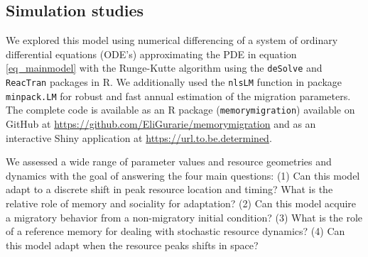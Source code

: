 \documentclass[12pt]{article}
\begin{document}
\subsection{Simulation studies}

We explored this model using numerical differencing of a system of ordinary differential equations (ODE's) approximating the PDE in equation \ref{eq_mainmodel} with the Runge-Kutte algorithm using the \texttt{deSolve} \citep{Soetaert2010} and \texttt{ReacTran} \citep{Soetaert2012} packages in R. We additionally used the \texttt{nlsLM} function in package \texttt{minpack.LM} \citep{minpack.lm} for robust and fast annual estimation of the migration parameters. The complete code is available as an R package (\texttt{memorymigration}) available on GitHub at \url{https://github.com/EliGurarie/memorymigration} and as an interactive Shiny application at \url{https://url.to.be.determined}.

We assessed a wide range of parameter values and resource geometries and dynamics with the goal of answering the four main questions: (1) Can this model adapt to a discrete shift in peak resource location and timing?  What is the relative role of memory and sociality for adaptation? (2) Can this model acquire a migratory behavior from a non-migratory initial condition? (3) What is the role of a reference memory for dealing with stochastic resource dynamics? (4) Can this model adapt when the resource peaks shifts in space?
\end{document}
